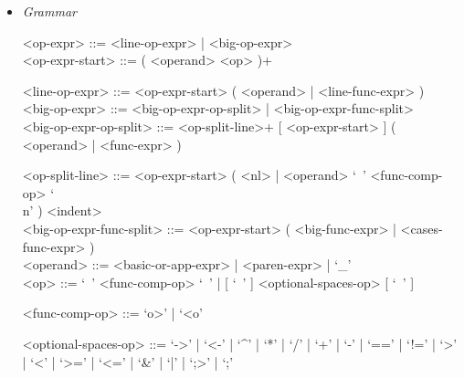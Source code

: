 \documentclass{article}
\begin{document}
\begin{itemize}
\begin{verbatim}
"Hello, I'm a big string that's going to contain multiple values from " +
"inside the imaginary program that I'm a part of. Here they are:\n" +
"value1 = " + value1 + ", value2 = " + value2 + ", value3 = " + value3 + 
", value4 = " + value4 + ", value5 = " + value5
\end{verbatim}

\textbf{Description}

It is possible to stretch a (big) operator expression over multiple lines.
In that case:
\begin{itemize}
\item
The operator expression must split in a new line after an operator (not an
argument).

\item
Every line after the first must be indented so that in begins at the column 
where the first line of the operator expression begun.

\item
The precise indentation rules are described in the section
"Indentation System" \ref{subsubsec:indsys}.
\end{itemize}

\item \textit{Grammar}
\begin{grammar}
<op-expr> ::= <line-op-expr> | <big-op-expr>
\\

<op-expr-start> ::= ( <operand> <op> )+

<line-op-expr> ::= <op-expr-start> ( <operand> | <line-func-expr> )
\\

<big-op-expr> ::= 
<big-op-expr-op-split> | <big-op-expr-func-split>
\\

<big-op-expr-op-split> ::= 
<op-split-line>+ [ <op-expr-start> ] ( <operand> | <func-expr> )

<op-split-line> ::=
<op-expr-start> ( <nl> | <operand> `\ ' <func-comp-op> `\\n' ) <indent> 
\\

<big-op-expr-func-split> ::=
<op-expr-start> ( <big-func-expr> | <cases-func-expr> )
\\

<operand> ::= <basic-or-app-expr> | <paren-expr> | `_'
\\

<op> ::= `\ ' <func-comp-op> `\ ' | [ `\ ' ] <optional-spaces-op> [ `\ ' ]

<func-comp-op> ::= `o>' | `<o'

<optional-spaces-op> ::= 
`->' | `<-' | `^' | `*' | `/' | `+' | `-' | `==' | `!=' | `>' | `<' | `>=' |
`<=' | `\&' | `|' | `;>' | `;'
\end{grammar}
\end{itemize}
\end{document}
